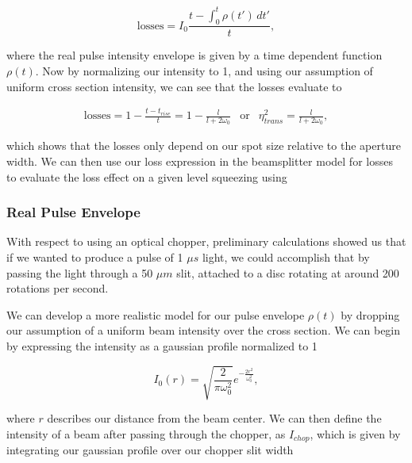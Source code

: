 \begin{equation}
  \label{eq:pulse_losses}
  \text{losses} = I_0\frac{t - \int^t_0 \rho(t') \, dt'}{t} , 
\end{equation}

\noindent
where the real pulse intensity envelope is given by a time dependent function $\rho(t)$.  Now by normalizing our intensity to 1, and using our assumption of uniform cross section intensity, we can see that the losses evaluate to

\begin{eqnarray}
  \label{eq:bs_pulse_losses}
  \text{losses} = 1 - \frac{t-t_{rise}}{t} = 1 - \frac{l}{l+2 \omega_0}  & \text{or} & \eta^2_{trans} = \frac{l}{l+2 \omega_0}  ,
\end{eqnarray}

\noindent
which shows that the losses only depend on our spot size relative to the aperture width.  We can then use our loss expression in the beamsplitter model for losses to evaluate the loss effect on a given level squeezing using 





\subsubsection{Real Pulse Envelope}
\label{real_pulse_envelope} 

With respect to using an optical chopper, preliminary calculations showed us that if we wanted to produce a pulse of 1 $\mu s$ light, we could accomplish that by passing the light through a 50 $\mu m$ slit, attached to a disc rotating at around 200 rotations per second.

We can develop a more realistic model for our pulse envelope $\rho(t)$ by dropping our assumption of a uniform beam intensity over the cross section.  We can begin by expressing the intensity as a gaussian profile normalized to 1

\begin{equation}
  \label{eq:spot_gaussian}
  I_0(r) = \sqrt{\frac{2}{\pi \omega_0^2}} e^{-\frac{2r^2}{\omega_0^2} }, 
\end{equation}

\noindent
where $r$ describes our distance from the beam center.  We can then define the intensity of a beam after passing through the chopper, as $I_{chop}$, which is given by integrating our gaussian profile over our chopper slit width

